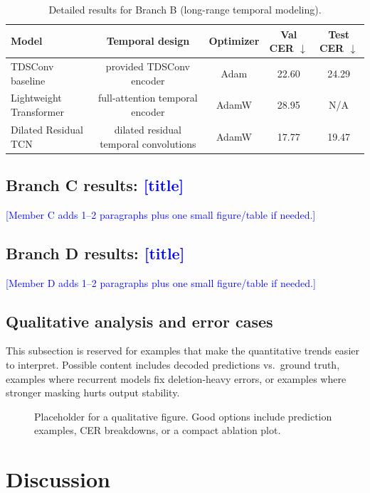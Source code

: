 \documentclass{article}
\newcommand{\todo}[1]{\textcolor{blue}{[#1]}}
\begin{document}
\begin{table}[t]
    \centering
    \caption{Detailed results for Branch B (long-range temporal modeling).}
    \label{tab:branchB}
    \small
    \begin{tabular}{lcccc}
        \toprule
        Model & Temporal design & Optimizer & Val CER $\downarrow$ & Test CER $\downarrow$ \\
        \midrule
        TDSConv baseline & provided TDSConv encoder & Adam & 22.60 & 24.29 \\
        Lightweight Transformer & full-attention temporal encoder & AdamW & 28.95 & N/A \\
        Dilated Residual TCN & dilated residual temporal convolutions & AdamW & 17.77 & 19.47 \\
        \bottomrule
    \end{tabular}
\end{table}

\subsection{Branch C results: \todo{title}}
\todo{Member C adds 1--2 paragraphs plus one small figure/table if needed.}

\subsection{Branch D results: \todo{title}}
\todo{Member D adds 1--2 paragraphs plus one small figure/table if needed.}

\subsection{Qualitative analysis and error cases}
This subsection is reserved for examples that make the quantitative trends easier to interpret.
Possible content includes decoded predictions vs.\ ground truth, examples where recurrent models fix deletion-heavy errors, or examples where stronger masking hurts output stability.

\begin{figure}[t]
    \centering
    \fbox{\rule{0pt}{1.4in}\rule{0.9\linewidth}{0pt}}
    \caption{Placeholder for a qualitative figure. Good options include prediction examples, CER breakdowns, or a compact ablation plot.}
    \label{fig:qualitative}
\end{figure}



\section{Discussion}
\label{sec:discussion}
\end{document}
